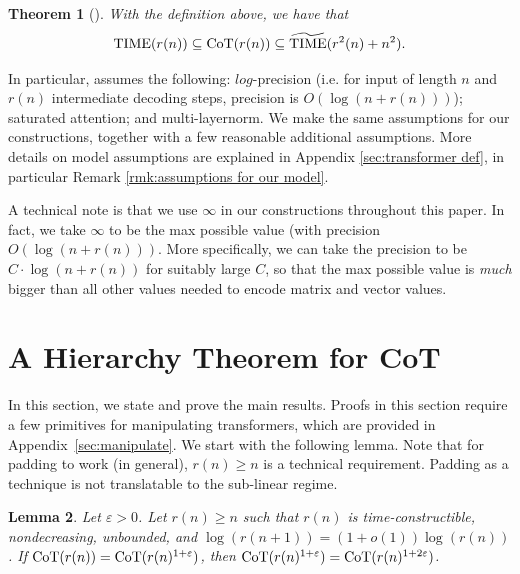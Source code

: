 \documentclass{article}
\let\epsilon\varepsilon
\newtheorem{theorem}{Theorem}[section]
\newtheorem{lemma}[theorem]{Lemma}
\theoremstyle{definition}
\newcommand{\0}{\mathbf{0}}
\newcommand{\CoT}{\mbox{\rm CoT}}
\newcommand{\1}{\mathbbm{1}}
\newcommand{\TIME}{\mbox{\rm TIME}}
\begin{document}
\begin{theorem}[\cite{merrill2023expressive}] \label{thm:hierrachy TIME vs CoT in MS23}
    With the definition above, we have that 
    \begin{equation*}
        \TIME(r(n)) \subseteq \CoT(r(n)) \subseteq \widetilde{\TIME}(r^2(n) + n^2).
    \end{equation*}
\end{theorem}
In particular, \cite{merrill2023expressive} assumes the following: $log$-precision (i.e. for input of length $n$ and $r(n)$ intermediate decoding steps, precision is $O(\log(n + r(n)))$); saturated attention; and multi-layernorm. We make the same assumptions for our constructions, together with a few reasonable additional assumptions. More details on model assumptions are explained in Appendix \ref{sec:transformer def}, in particular Remark \ref{rmk:assumptions for our model}.

A technical note is that we use $\infty$ in our constructions throughout this paper. In fact, we take $\infty$ to be the max possible value (with precision $O(\log(n + r(n)))$. More specifically, we can take the precision to be $C \cdot \log(n + r(n))$ for suitably large $C$, so that the max possible value is \textit{much} bigger than all other values needed to encode matrix and vector values.





\section{A Hierarchy Theorem for \CoT} \label{section:main results}

In this section, we state and prove the main results. Proofs in this section require a few primitives for manipulating transformers, which are provided in Appendix~\ref{sec:manipulate}. We start with the following lemma. Note that for padding to work (in general), $r(n) \geq n$ is a technical requirement. Padding as a technique is not translatable to the sub-linear regime.

\begin{lemma} \label{CoTAmplification}
    Let $\epsilon > 0$. Let $r(n) \geq n$ such that $r(n)$ is time-constructible, nondecreasing, unbounded, and $\log(r(n+1)) = (1+o(1)) \log(r(n))$. If $\CoT(r(n)) = \CoT(r(n)^{1 + \epsilon})$, then $\CoT(r(n)^{1 + \epsilon}) = \CoT(r(n)^{1 + 2 \epsilon})$. 
\end{lemma}
\end{document}

